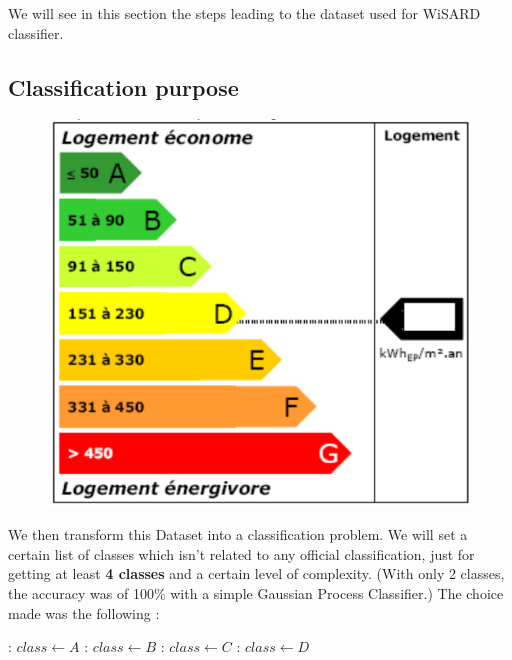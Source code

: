 \documentclass[a4paper, 11pt]{article}
\begin{document}
We will see in this section the steps leading to the dataset used for WiSARD
classifier.

\subsection{Classification purpose}

\begin{multicols}{1}

\begin{figure}
    \includegraphics[width=0.95\linewidth]{../figures_trabalho_final/classification_consomation.png}
\end{figure}

We then transform this Dataset into a classification problem.
We will set a certain list of classes which isn't related to any official
classification, just for getting at least \textbf{4 classes} and a certain
level of complexity. (With only 2 classes, the accuracy was of 100\% with a
simple Gaussian Process Classifier.)
The choice made was the following :
\end{multicols}
\newpage

\begin{algorithm}
\begin{algorithmic}[1]
    \If {$y \in [0, 25[$}:
      \State $class \gets A$
    \ElsIf {$y \in [25, 50[$}:
      \State $class \gets B$
    \ElsIf {$y \in [50, 75[$}:
      \State $class \gets C$
    \ElsIf {$y \in [75, 100[$}:
      \State $class \gets D$
  \EndFor
\end{algorithmic}
\end{algorithm}
\end{document}
